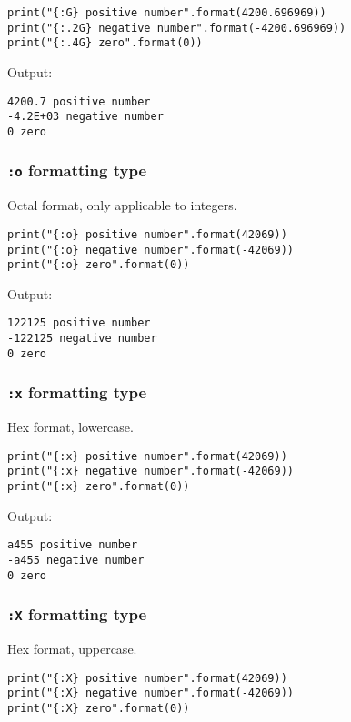 \documentclass[11pt]{article}
\begin{document}
\begin{verbatim}
print("{:G} positive number".format(4200.696969))
print("{:.2G} negative number".format(-4200.696969))
print("{:.4G} zero".format(0))
\end{verbatim}

 \noindent Output:

\label{org426896c}
\begin{verbatim}
4200.7 positive number
-4.2E+03 negative number
0 zero
\end{verbatim}
\subsubsection{\texttt{:o} formatting type}
\label{sec:org281e06a}
Octal format, only applicable to integers.

\begin{verbatim}
print("{:o} positive number".format(42069))
print("{:o} negative number".format(-42069))
print("{:o} zero".format(0))
\end{verbatim}

 \noindent Output:

\label{orga78f157}
\begin{verbatim}
122125 positive number
-122125 negative number
0 zero
\end{verbatim}
\subsubsection{\texttt{:x} formatting type}
\label{sec:org9861503}
Hex format, lowercase.

\begin{verbatim}
print("{:x} positive number".format(42069))
print("{:x} negative number".format(-42069))
print("{:x} zero".format(0))
\end{verbatim}

 \noindent Output:

\label{orgcbaf64a}
\begin{verbatim}
a455 positive number
-a455 negative number
0 zero
\end{verbatim}
\subsubsection{\texttt{:X} formatting type}
\label{sec:org07517b6}
Hex format, uppercase.

\begin{verbatim}
print("{:X} positive number".format(42069))
print("{:X} negative number".format(-42069))
print("{:X} zero".format(0))
\end{verbatim}
\end{document}
